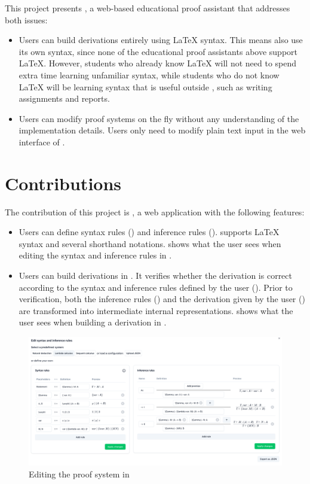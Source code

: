 This project presents \projectname{}, a web-based educational proof assistant that addresses both issues:
\begin{itemize}
    \item Users can build derivations entirely using \LaTeX{} syntax. This means \projectname{} also use its own syntax, since none of the educational proof assistants above support \LaTeX{}. However, students who already know \LaTeX{} will not need to spend extra time learning unfamiliar syntax, while students who do not know \LaTeX{} will be learning syntax that is useful outside \projectname{}, such as writing assignments and reports.
    \item Users can modify proof systems on the fly without any understanding of the implementation details. Users only need to modify plain text input in the web interface of \projectname{}.
\end{itemize}

\section{Contributions}
The contribution of this project is \projectname{}, a web application with the following features:
\begin{itemize}
    \item Users can define syntax rules () and inference rules (). \projectname{} supports \LaTeX{} syntax and several shorthand notations.  shows what the user sees when editing the syntax and inference rules in \projectname{}.
    \item Users can build derivations in \projectname{}. It verifies whether the derivation is correct according to the syntax and inference rules defined by the user (). Prior to verification, both the inference rules () and the derivation given by the user () are transformed into intermediate internal representations.  shows what the user sees when building a derivation in \projectname{}.
\end{itemize}

\begin{figure}[!htbp]
    \centering
    \includegraphics[width=\textwidth]{introduction/editor.png}
    \caption{Editing the proof system in \projectname{}}
    \label{fig:introduction:editor}
\end{figure}

